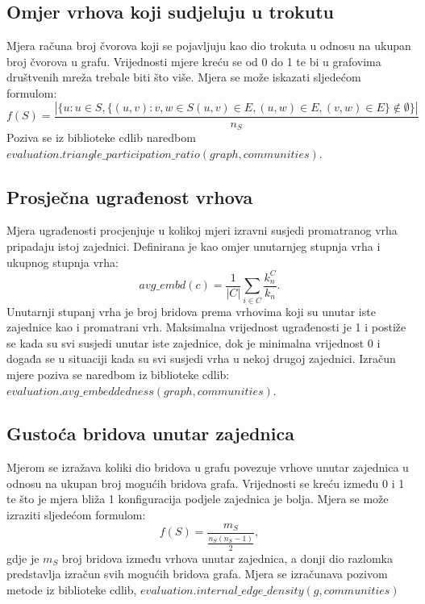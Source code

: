 \documentclass[times, utf8, diplomski]{fer}
\begin{document}
\pagebreak
\subsection{Omjer vrhova koji sudjeluju u trokutu}
Mjera računa broj čvorova koji se pojavljuju kao dio trokuta u odnosu na ukupan broj čvorova u grafu. Vrijednosti mjere kreću se od 0 do 1 te bi u grafovima društvenih mreža trebale biti što više. Mjera se može iskazati sljedećom formulom:
\begin{equation}
	f(S) = \frac{| \{ u : u \in S, \{(u,v):v, w \in S (u,v) \in E, (u,w) \in E, (v,w) \in E \}  \notin \emptyset \} | }{n_{S}}
\end{equation}
Poziva se iz biblioteke cdlib naredbom \\ $evaluation.triangle\_participation\_ratio(graph, communities).$


\subsection{Prosječna ugrađenost vrhova}
Mjera ugrađenosti procjenjuje u kolikoj mjeri izravni susjedi promatranog vrha pripadaju istoj zajednici. Definirana je kao omjer unutarnjeg stupnja vrha i ukupnog stupnja vrha: 
\begin{equation}
	avg\_embd(c) = \frac{1}{|C|} \sum_{i \in C} \frac{k_{n}^{C}}{k_{n}}.
\end{equation}
Unutarnji stupanj vrha je broj bridova prema vrhovima koji su unutar iste zajednice kao i promatrani vrh. Maksimalna vrijednost ugrađenosti je 1 i postiže se kada su svi susjedi unutar iste zajednice, dok je minimalna vrijednost 0 i događa se u situaciji kada su svi susjedi vrha u nekoj drugoj zajednici. Izračun mjere poziva se naredbom iz biblioteke cdlib: $evaluation.avg\_embeddedness(graph,communities)$.


\subsection{Gustoća bridova unutar zajednica}
Mjerom se izražava koliki dio bridova u grafu povezuje vrhove unutar zajednica u odnosu na ukupan broj mogućih bridova grafa. Vrijednosti se kreću između 0 i 1 te što je mjera bliža 1 konfiguracija podjele zajednica je bolja. Mjera se može izraziti sljedećom formulom:
\begin{equation}
	f(S) = \frac{m_{S}}{\frac{n_{S}(n_{S} - 1)}{2}},
\end{equation}
gdje je $m_{S}$ broj bridova između vrhova unutar zajednica, a donji dio razlomka predstavlja izračun svih mogućih bridova grafa. Mjera se izračunava pozivom metode iz biblioteke cdlib, $evaluation.internal\_edge\_density(g,communities)$
\end{document}
